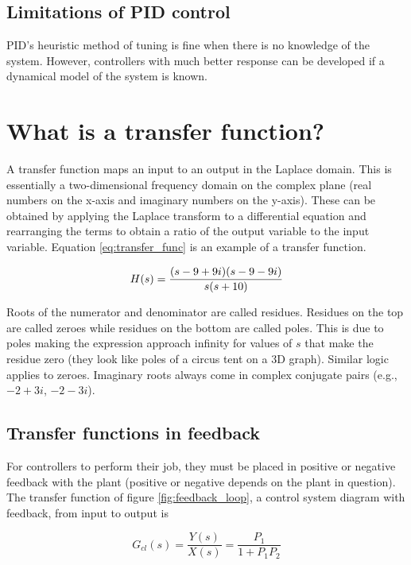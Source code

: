 \documentclass[10pt,conference,compsoc]{IEEEtran}
\begin{document}
\subsection{Limitations of PID control}

PID's heuristic method of tuning is fine when there is no knowledge of the
\gls{system}. However, controllers with much better response can be developed if
a dynamical model of the \gls{system} is known.

\section{What is a transfer function?}

A transfer function maps an input to an output in the Laplace domain. This is
essentially a two-dimensional frequency domain on the complex plane (real
numbers on the x-axis and imaginary numbers on the y-axis). These can be
obtained by applying the Laplace transform to a differential equation and
rearranging the terms to obtain a ratio of the output variable to the input
variable. Equation \ref{eq:transfer_func} is an example of a transfer function.

\begin{equation} \label{eq:transfer_func}
  H(s) = \frac{(s-9+9i)(s-9-9i)}{s(s+10)} \\
\end{equation}

Roots of the numerator and denominator are called residues. Residues on the top
are called zeroes while residues on the bottom are called poles. This is due to
poles making the expression approach infinity for values of $s$ that make the
residue zero (they look like poles of a circus tent on a 3D graph). Similar
logic applies to zeroes. Imaginary roots always come in complex conjugate pairs
(e.g., $-2 + 3i$, $-2 - 3i$).

\subsection{Transfer functions in feedback}

For \glspl{controller} to perform their job, they must be placed in positive or
negative feedback with the \gls{plant} (positive or negative depends on the
\gls{plant} in question). The transfer function of figure
\ref{fig:feedback_loop}, a control system diagram with feedback, from input to
output is

\begin{equation}
  G_{cl}(s) = \frac{Y(s)}{X(s)} = \frac{P_1}{1 + P_1 P_2}
\end{equation}
\end{document}
